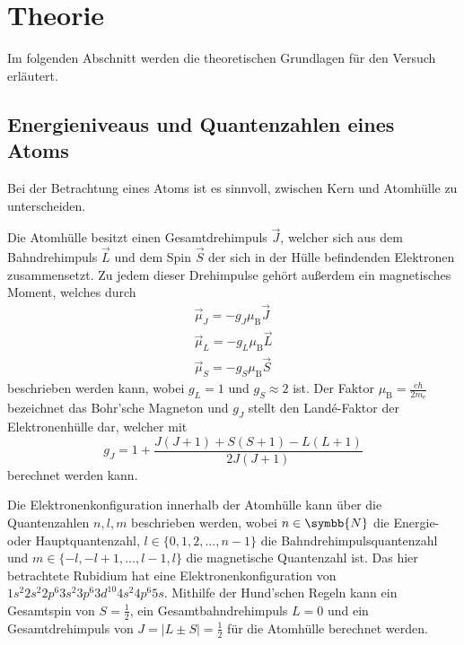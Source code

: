 \section{Theorie}
\label{sec:theorie}

    Im folgenden Abschnitt werden die theoretischen Grundlagen für den Versuch erläutert.

\subsection{Energieniveaus und Quantenzahlen eines Atoms}

    Bei der Betrachtung eines Atoms ist es sinnvoll,
    zwischen Kern und Atomhülle zu unterscheiden.

    Die Atomhülle besitzt einen Gesamtdrehimpuls $\vec{J}$,
    welcher sich aus dem Bahndrehimpuls $\vec{L}$ und dem Spin $\vec{S}$ der sich in der Hülle befindenden Elektronen zusammensetzt.
    Zu jedem dieser Drehimpulse gehört außerdem ein magnetisches Moment,
    welches durch
    \begin{gather}
        \vec{\mu}_J = -g_J \mu_\text{B} \vec{J} \\
        \vec{\mu}_L = -g_L \mu_\text{B} \vec{L} \\
        \vec{\mu}_S = -g_S \mu_\text{B} \vec{S}
    \end{gather}
    beschrieben werden kann,
    wobei $g_L = 1$ und $g_S \approx 2$ ist.
    Der Faktor $\mu_\text{B} = \frac{e \hbar}{2m_\text{e}}$ bezeichnet das Bohr'sche Magneton und $g_J$ stellt den Landé-Faktor der Elektronenhülle dar,
    welcher mit
    \begin{equation}
        g_J = 1 + \frac{J(J+1) + S(S+1) - L(L+1)}{2J(J+1)}
        \label{eqn:landeJ}
    \end{equation}
    berechnet werden kann.

    Die Elektronenkonfiguration innerhalb der Atomhülle kann über die Quantenzahlen $n, l, m$ beschrieben werden,
    wobei $n \in \symbb{N}$ die Energie- oder Hauptquantenzahl,
    $l \in \{0, 1, 2, ..., n-1\}$ die Bahndrehimpulsquantenzahl und $m \in \{-l, -l+1, ..., l-1, l\}$ die magnetische Quantenzahl ist.
    Das hier betrachtete Rubidium hat eine Elektronenkonfiguration von $1s^2 2s^2 2p^6 3s^2 3p^6 3d^{10} 4s^2 4p^6 5s$.
    Mithilfe der Hund'schen Regeln kann ein Gesamtspin von $S=\frac{1}{2}$,
    ein Gesamtbahndrehimpuls $L=0$ und ein Gesamtdrehimpuls von $J = \lvert L \pm S \rvert = \frac{1}{2}$ für die Atomhülle berechnet werden.

